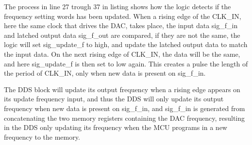     The process in line 27 trough 37 in listing  shows how the logic detects if the frequency setting words has been updated. When a rising edge of the CLK\_IN, here the same clock that drives the DAC, takes place, the input data sig\_f\_in and latched output data sig\_f\_out are compared, if they are not the same, the logic will set sig\_update\_f to high, and update the latched output data to match the input data. On the next rising edge of CLK\_IN, the data will be the same, and here sig\_update\_f is then set to low again. This creates a pulse the length of the period of CLK\_IN, only when new data is present on sig\_f\_in. 
    
    The DDS block will update its output frequency when a rising edge appears on its update frequency input, and thus the DDS will only update its output frequency when new data is present on sig\_f\_in, and sig\_f\_in is generated from concatenating the two memory registers containing the DAC frequency, resulting in the DDS only updating its frequency when the MCU programs in a new frequency to the memory.